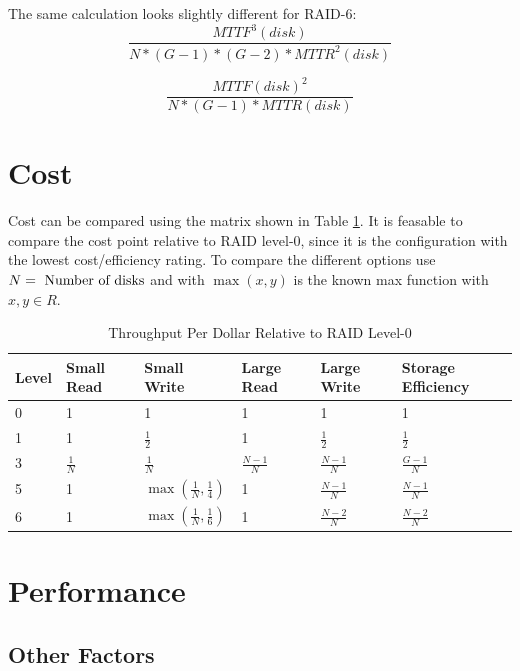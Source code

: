 \documentclass{article}
\begin{document}
The same calculation looks slightly different for RAID-6:
\begin{equation}
    \frac
    {MTTF^3(disk)}
    {N*(G-1)*(G-2)*MTTR^2(disk)}
\end{equation}

\begin{equation}
    \label{eq:r6-mtbw}
    \frac{MTTF(disk)^2}{N*(G-1)*MTTR(disk)}
\end{equation}

\section{Cost}
Cost can be compared using the matrix shown in Table \ref{tab:economics}.
It is feasable to compare the cost point relative to RAID level-0, since it
is the configuration with the lowest cost/efficiency rating.
To compare the different options use \( N = \textnormal{ Number of disks}\)
and with \(\max\left(x,y\right)\) is the known max function with \( x, y \in R \). \cite{cmu:raidhighperf}

\begin{table}[h]
    \begin{tabularx}{\textwidth}{l|X|X|X|X|X}
        \textbf{Level} &
        Small Read &
        Small Write &
        Large Read &
        Large Write &
        Storage Efficiency \\
        \hline
        0 & 1 & 1 & 1 & 1 & 1 \\
        1 & 1 & \( \frac{1}{2} \) & 1 & \( \frac{1}{2} \) & \( \frac{1}{2} \) \\
        3 & \( \frac{1}{N} \) & \( \frac{1}{N} \) & \( \frac{N-1}{N} \) & \( \frac{N-1}{N} \) & \( \frac{G-1}{N} \) \\
        5 & 1 & \( \max\left(\frac{1}{N},\frac{1}{4}\right) \) & 1 & \( \frac{N-1}{N} \) & \( \frac{N-1}{N} \) \\
        6 & 1 & \( \max\left(\frac{1}{N},\frac{1}{6}\right) \) & 1 & \( \frac{N-2}{N} \) & \( \frac{N-2}{N} \) \\
    \end{tabularx}
    \caption{Throughput Per Dollar Relative to RAID Level-0 \cite{cmu:raidhighperf}}
    \label{tab:economics}
\end{table}

\section{Performance}

\subsection{Other Factors}
\end{document}
